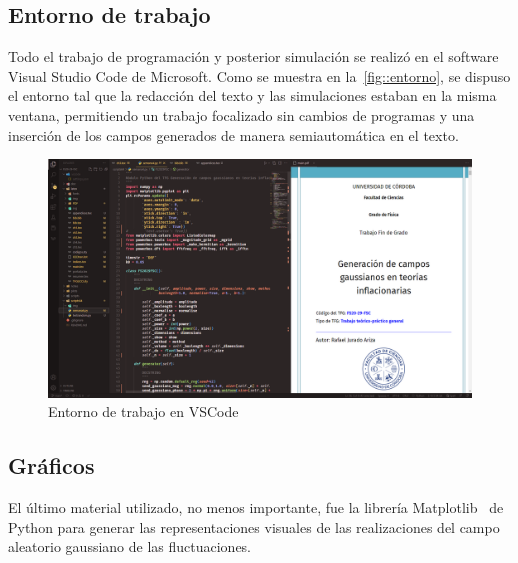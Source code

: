 \subsection{Entorno de trabajo}
Todo el trabajo de programación y posterior simulación se realizó en el software Visual Studio Code de Microsoft. Como se muestra en la~\autoref{fig::entorno}, se dispuso el entorno tal que la redacción del texto y las simulaciones estaban en la misma ventana, permitiendo un trabajo focalizado sin cambios de programas y una inserción de los campos generados de manera semiautomática en el texto.
\begin{figure}[t]
    \centering
    \includegraphics[width=\textwidth]{img/entorno.png}
    \caption{Entorno de trabajo en VSCode}
    \label{fig::entorno}
\end{figure}
\subsection{Gráficos}
El último material utilizado, no menos importante, fue la librería Matplotlib~\cite{Hunter2007} de Python para generar las representaciones visuales de las realizaciones del campo aleatorio gaussiano de las fluctuaciones.